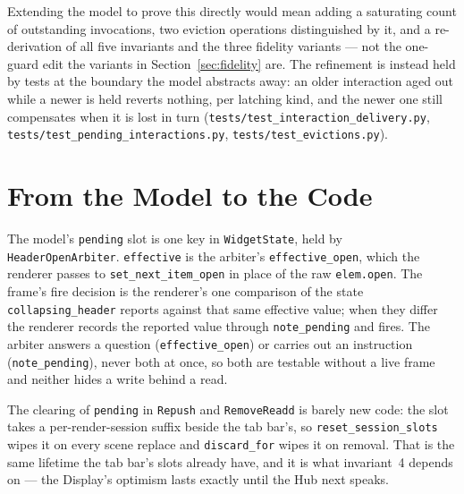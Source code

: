\documentclass[a4paper,10pt,fleqn]{article}
\begin{document}
Extending the model to prove this directly would mean adding a saturating count
of outstanding invocations, two eviction operations distinguished by it, and a
re-derivation of all five invariants and the three fidelity variants --- not the
one-guard edit the variants in Section~\ref{sec:fidelity} are.  The refinement
is instead held by tests at the boundary the model abstracts away: an older
interaction aged out while a newer is held reverts nothing, per latching kind,
and the newer one still compensates when it is lost in turn
(\texttt{tests/test\_interaction\_delivery.py},
\texttt{tests/test\_pending\_interactions.py},
\texttt{tests/test\_evictions.py}).

\section{From the Model to the Code}

The model's \texttt{pending} slot is one key in \texttt{WidgetState}, held by
\texttt{HeaderOpenArbiter}.  \texttt{effective} is the arbiter's
\texttt{effective\_open}, which the renderer passes to
\texttt{set\_next\_item\_open} in place of the raw \texttt{elem.open}.  The
frame's fire decision is the renderer's one comparison of the state
\texttt{collapsing\_header} reports against that same effective value; when
they differ the renderer records the reported value through
\texttt{note\_pending} and fires.  The arbiter answers a question
(\texttt{effective\_open}) or carries out an instruction
(\texttt{note\_pending}), never both at once, so both are testable without a
live frame and neither hides a write behind a read.

The clearing of \texttt{pending} in \texttt{Repush} and \texttt{RemoveReadd} is
barely new code: the slot takes a per-render-session suffix beside the tab
bar's, so \texttt{reset\_session\_slots} wipes it on every scene replace and
\texttt{discard\_for} wipes it on removal.  That is the same lifetime the tab
bar's slots already have, and it is what invariant~4 depends on --- the
Display's optimism lasts exactly until the Hub next speaks.
\end{document}
